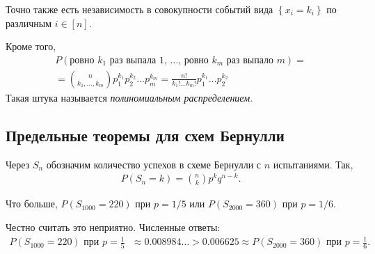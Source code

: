 \begin{prop*}
 Точно также есть независимость в совокупности событий вида $\left\{ x_i = k_i \right\}$  по различным $i \in [n]$. 
\end{prop*}

\begin{prop*}
 Кроме того,
 \begin{align*}
  P(\text{ровно $k_1$ раз выпала $1$, \ldots, ровно $k_m$ раз выпало $m$}) = \\
  = \binom n {k_1,\ldots,k_m} p_1^{k_1} p_2^{k_2} \ldots p_m^{k_m} = \frac{n!}{k_1! \ldots k_m!} p_1^{k_1} \ldots p_2^{k_2}
 \end{align*} Такая штука называется \textit{полиномиальным распределением}.
\end{prop*}


\subsection{Предельные теоремы для схем Бернулли}

\begin{notatn*}
 Через $S_n$ обозначим количество успехов в схеме Бернулли с $n$ испытаниями. Так,
 \begin{align*}
  P(S_n = k) = \binom n k p^{k} q^{n-k}.
 \end{align*} 
\end{notatn*}

\begin{exmpl*}
 Что больше, $P(S_{1000} = 220)$ при $p = 1 / 5$ или $P(S_{2000} = 360)$ при $p = 1 / 6$.

 Честно считать это неприятно. Численные ответы:
 \begin{align*}
  P(S_{1000} = 220) \text{ при $p = \frac{1}{5}$ } \approx 0.008984\ldots > 0.006625 \approx P(S_{2000} = 360) \text{ при $p = \frac{1}{6}$}
 .\end{align*}
\end{exmpl*}

